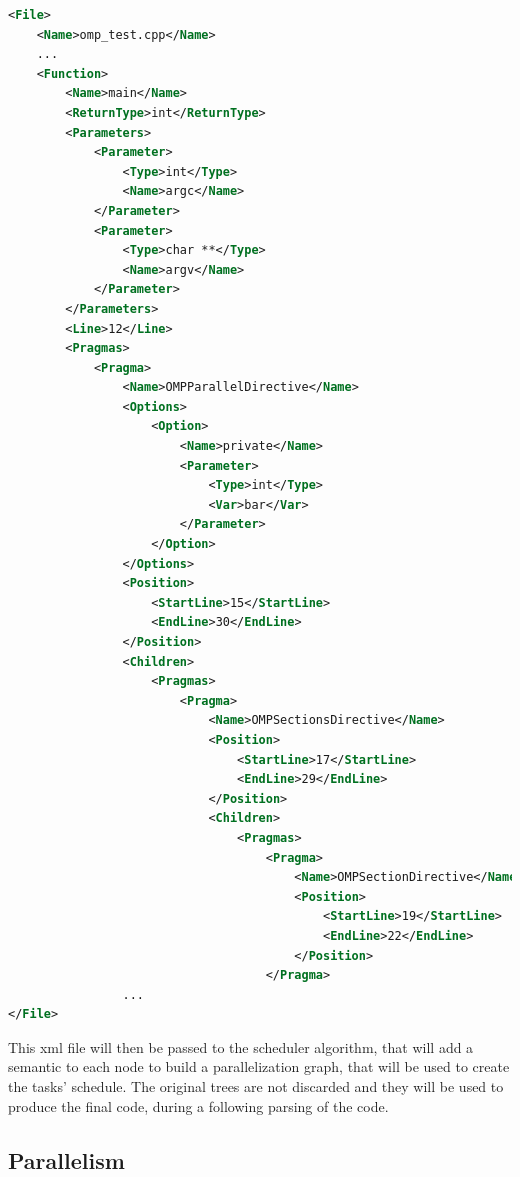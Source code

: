 \documentclass[a4paper,11pt,oneside]{book}
\begin{document}
\begin{lstlisting}[language=XML, caption=XML file of the pragma structure of Code~\ref{code}., label=xmlpragma]
<File>
    <Name>omp_test.cpp</Name>    
    ...
    <Function>
        <Name>main</Name>
        <ReturnType>int</ReturnType>
        <Parameters>
            <Parameter>
                <Type>int</Type>
                <Name>argc</Name>
            </Parameter>
            <Parameter>
                <Type>char **</Type>
                <Name>argv</Name>
            </Parameter>
        </Parameters>
        <Line>12</Line>
        <Pragmas>
            <Pragma>
                <Name>OMPParallelDirective</Name>
                <Options>
                    <Option>
                        <Name>private</Name>
                        <Parameter>
                            <Type>int</Type>
                            <Var>bar</Var>
                        </Parameter>
                    </Option>
                </Options>
                <Position>
                    <StartLine>15</StartLine>
                    <EndLine>30</EndLine>
                </Position>
                <Children>
                    <Pragmas>
                        <Pragma>
                            <Name>OMPSectionsDirective</Name>
                            <Position>
                                <StartLine>17</StartLine>
                                <EndLine>29</EndLine>
                            </Position>
                            <Children>
                                <Pragmas>
                                    <Pragma>
                                        <Name>OMPSectionDirective</Name>
                                        <Position>
                                            <StartLine>19</StartLine>
                                            <EndLine>22</EndLine>
                                        </Position>
                                    </Pragma>
				...
</File>
\end{lstlisting}
This xml file will then be passed to the scheduler algorithm, that will add a semantic to each node to build a parallelization graph, that will be used to create the tasks’ schedule. The original trees are not discarded and they will be used to produce the final code, during a following parsing of the code.

\subsection{Parallelism}
\end{document}
